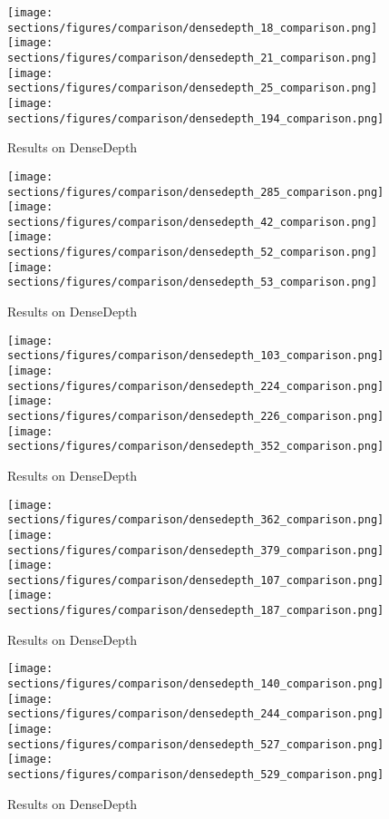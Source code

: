 \begin{figure*}
  \texttt{[image: sections/figures/comparison/densedepth\_18\_comparison.png]}
  \texttt{[image: sections/figures/comparison/densedepth\_21\_comparison.png]}
  \texttt{[image: sections/figures/comparison/densedepth\_25\_comparison.png]}
  \texttt{[image: sections/figures/comparison/densedepth\_194\_comparison.png]}
  \caption{Results on DenseDepth}
\end{figure*}
\begin{figure*}
  \texttt{[image: sections/figures/comparison/densedepth\_285\_comparison.png]}
  \texttt{[image: sections/figures/comparison/densedepth\_42\_comparison.png]}
  \texttt{[image: sections/figures/comparison/densedepth\_52\_comparison.png]}
  \texttt{[image: sections/figures/comparison/densedepth\_53\_comparison.png]}
  \caption{Results on DenseDepth}
\end{figure*}
\begin{figure*}
  \texttt{[image: sections/figures/comparison/densedepth\_103\_comparison.png]}
  \texttt{[image: sections/figures/comparison/densedepth\_224\_comparison.png]}
  \texttt{[image: sections/figures/comparison/densedepth\_226\_comparison.png]}
  \texttt{[image: sections/figures/comparison/densedepth\_352\_comparison.png]}
  \caption{Results on DenseDepth}
\end{figure*}
\begin{figure*}
  \texttt{[image: sections/figures/comparison/densedepth\_362\_comparison.png]}
  \texttt{[image: sections/figures/comparison/densedepth\_379\_comparison.png]}
  \texttt{[image: sections/figures/comparison/densedepth\_107\_comparison.png]}
  \texttt{[image: sections/figures/comparison/densedepth\_187\_comparison.png]}
  \caption{Results on DenseDepth}
\end{figure*}
\begin{figure*}
  \texttt{[image: sections/figures/comparison/densedepth\_140\_comparison.png]}
  \texttt{[image: sections/figures/comparison/densedepth\_244\_comparison.png]}
  \texttt{[image: sections/figures/comparison/densedepth\_527\_comparison.png]}
  \texttt{[image: sections/figures/comparison/densedepth\_529\_comparison.png]}
  \caption{Results on DenseDepth}
\end{figure*}

